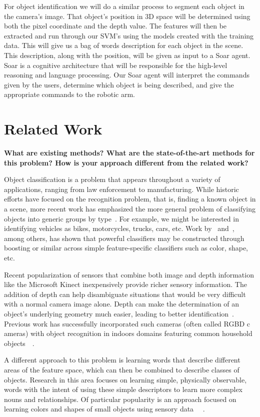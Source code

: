 \documentclass[11pt]{article}
\newcommand{\xxx}[1]{{\bf \color{red} #1}}
\begin{document}
For object identification we will do a similar process to segment each object in the camera's image. That object's position in 3D space will be determined using both the pixel coordinate and the depth value. The features will then be extracted and run through our SVM's using the models created with the training data. This will give us a bag of words description for each object in the scene. This description, along with the position, will be given as input to a Soar agent. Soar is a cognitive architecture that will be responsible for the high-level reasoning and language processing. Our Soar agent will interpret the commands given by the users, determine which object is being described, and give the appropriate commands to the robotic arm.


\section{Related Work}
\xxx{What are existing methods? What are the state-of-the-art methods for this
    problem? How is your approach different from the related work?}

Object classification is a problem that appears throughout a variety of
applications, ranging from law enforcement to manufacturing. While historic
efforts have focused on the recognition problem, that is, finding a known object
in a scene, more recent work has emphasized the more general problem of
classifying objects into generic groups by type~\cite{huber2004parts}. For example,
we might be interested in identifying vehicles as bikes, motorcycles, trucks,
cars, etc. Work by~\cite{nilsback2006visual} and~\cite{gehler2009feature}, among
others, has shown that powerful classifiers may be constructed through boosting
or similar across simple feature-specific classifiers such as color, shape, etc.

Recent popularization of sensors that combine both image and depth information
like the Microsoft Kinect inexpensively provide richer sensory information. The
addition of depth can help disambiguate situations that would be very difficult
with a normal camera image alone. Depth can make the determination of an object’s
underlying geometry much easier, leading to better identification~\cite{marton2010hierarchical}.
Previous work has successfully incorporated such cameras (often called RGBD c
ameras) with object recognition in indoors domains featuring common household
objects~\cite{marton2010hierarchical}~\cite{lai2011sparse}.

A different approach to this problem is learning words that describe different
areas of the feature space, which can then be combined to describe classes of
objects. Research in this area focuses on learning simple, physically observable,
words with the intent of using these simple descriptors to learn more complex
nouns and relationships. Of particular popularity is an approach focused on
learning colors and shapes of small objects using sensory data~\cite{zambuto2010visually}
~\cite{roy2002learning}.
\end{document}
